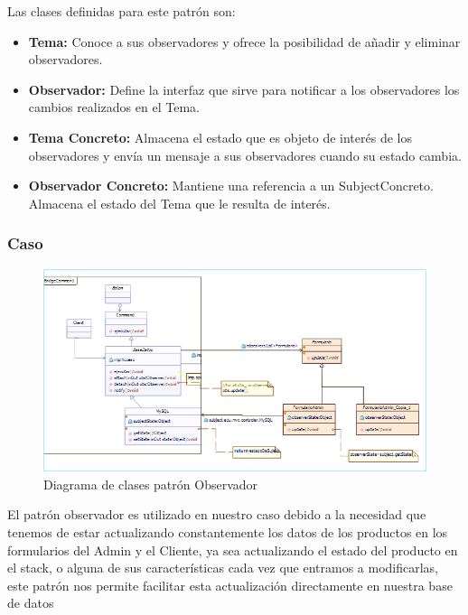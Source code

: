 Las clases definidas para este patrón son:

\begin{itemize}
	\item \textbf{Tema: }Conoce a sus observadores y ofrece la posibilidad de añadir y eliminar observadores.
	\item \textbf{Observador: }Define la interfaz que sirve para notificar a los observadores los cambios realizados en el Tema.
	\item \textbf{Tema Concreto: }Almacena el estado que es objeto de interés de los observadores y envía un mensaje a sus observadores cuando su estado cambia.
	\item \textbf{Observador Concreto: }Mantiene una referencia a un SubjectConcreto. Almacena el estado del Tema que le resulta de interés.
\end{itemize}



\subsubsection{Caso}
	\begin{figure}[h!]
	\centering
	\includegraphics[width=1.0\linewidth]{arquitectura/imagenes/DiagramaObservador}
	\caption{Diagrama de clases patrón Observador}
\end{figure}



El patrón observador es utilizado en nuestro caso debido a la necesidad que tenemos de estar actualizando constantemente los datos de los productos en los formularios del Admin y el Cliente, ya sea actualizando el estado del producto en el stack, o alguna de sus características cada vez que entramos a modificarlas, este patrón nos permite facilitar esta actualización directamente en nuestra base de datos
\newpage

